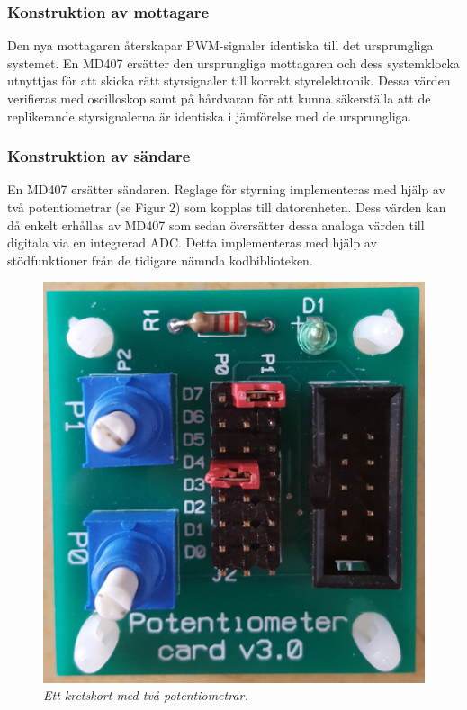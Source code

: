 \documentclass[a4paper]{article}
\begin{document}
\subsubsection{Konstruktion av mottagare}
Den nya mottagaren återskapar PWM-signaler identiska till det ursprungliga systemet. En MD407 ersätter den ursprungliga mottagaren och dess systemklocka utnyttjas för att skicka rätt styrsignaler till korrekt styrelektronik. Dessa värden verifieras med oscilloskop samt på hårdvaran för att kunna säkerställa att de replikerande styrsignalerna är identiska i jämförelse med de ursprungliga.





\subsubsection{Konstruktion av sändare}
En MD407 ersätter sändaren. Reglage för styrning implementeras med hjälp av två potentiometrar (se Figur 2) som kopplas till datorenheten. Dess värden kan då enkelt erhållas av MD407 som sedan översätter dessa analoga värden till digitala via en integrerad ADC. Detta implementeras med hjälp av stödfunktioner från de tidigare nämnda kodbiblioteken.

\begin{figure}[H]
\includegraphics[scale=0.04]{Potentiometer.jpg}
\centering
\caption{\it Ett kretskort med två potentiometrar.}
\end{figure}
\end{document}
